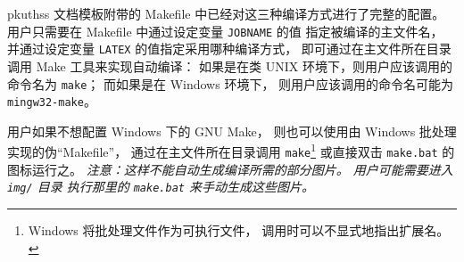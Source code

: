 	pkuthss 文档模板附带的 Makefile 中已经对这三种编译方式进行了完整的配置。
	用户只需要在 Makefile 中通过设定变量 \verb|JOBNAME| 的值%
	指定被编译的主文件名，
	并通过设定变量 \verb|LATEX| 的值指定采用哪种编译方式，
	即可通过在主文件所在目录调用 Make 工具来实现自动编译：
	如果是在类 UNIX 环境下，则用户应该调用的命令名为 \verb|make|；
	而如果是在 Windows 环境下，
	则用户应该调用的命令名可能为 \verb|mingw32-make|。

	用户如果不想配置 Windows 下的 GNU Make，
	则也可以使用由 Windows 批处理实现的伪“Makefile”，
	通过在主文件所在目录调用 \verb|make|\footnote{%
		Windows 将批处理文件作为可执行文件，
		调用时可以不显式地指出扩展名。%
	} 或直接双击 \verb|make.bat| 的图标运行之。%
	\emph
	{%
		注意：这样不能自动生成编译所需的部分图片。
		用户可能需要进入 \texttt{img/} 目录%
		执行那里的 \texttt{make.bat} 来手动生成这些图片。
	}

